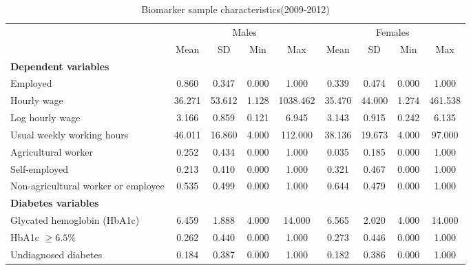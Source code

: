 \documentclass[12pt,english,british]{article}
\newcommand{\sym}[1]{\rlap{#1}}%
\begin{document}
\begin{table}[h!]
\caption{\label{tab:Biomarker-sample-characteristics}Biomarker sample characteristics(2009-2012)}
\begin{center}
\begin{adjustbox}{max width=\textwidth}
{ \def\sym#1{\ifmmode^{#1}\else\(^{#1}\)\fi} \begin{tabular}{l*{2}{cccc}}
\toprule
                    &\multicolumn{4}{c}{Males}                          &\multicolumn{4}{c}{Females}                        \\
                    &        Mean&          SD&         Min&         Max&        Mean&          SD&         Min&         Max\\
\midrule
\textbf{Dependent variables} &&&&&&&& \\
Employed            &       0.860&       0.347&       0.000&       1.000&       0.339&       0.474&       0.000&       1.000\\
Hourly wage            &      36.271&      53.612&       1.128&    1038.462&      35.470&      44.000&       1.274&     461.538\\
Log hourly wage     &       3.166&       0.859&       0.121&       6.945&       3.143&       0.915&       0.242&       6.135\\
Usual weekly working hours&      46.011&      16.860&       4.000&     112.000&      38.136&      19.673&       4.000&      97.000\\
Agricultural worker &       0.252&       0.434&       0.000&       1.000&       0.035&       0.185&       0.000&       1.000\\
Self-employed       &       0.213&       0.410&       0.000&       1.000&       0.321&       0.467&       0.000&       1.000\\
Non-agricultural worker or employee&       0.535&       0.499&       0.000&       1.000&       0.644&       0.479&       0.000&       1.000\\
\textbf{Diabetes variables} &&&&&&&& \\
Glycated hemoglobin (HbA1c)&       6.459&       1.888&       4.000&      14.000&       6.565&       2.020&       4.000&      14.000\\
HbA1c $\geq 6.5\%$&       0.262&       0.440&       0.000&       1.000&       0.273&       0.446&       0.000&       1.000\\
Undiagnosed diabetes&       0.184&       0.387&       0.000&       1.000&       0.182&       0.386&       0.000&       1.000\\

\end{tabular}}
\end{adjustbox}
\end{center}
\end{table}
\end{document}
